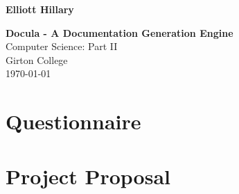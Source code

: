 \documentclass[twoside,12pt,notitlepage]{Classes/CUEDthesisPSnPDF}
\begin{document}
\pagestyle{empty}

\hfill{\LARGE \bf Elliott Hillary}

\vspace*{60mm}
\begin{center}
\Huge
{\bf Docula - A Documentation Generation Engine} \\
\vspace*{5mm}
Computer Science: Part II\\
\vspace*{5mm}
Girton College \\
\vspace*{5mm}
\today  %
\end{center}

\setcounter{secnumdepth}{3}
\setcounter{tocdepth}{3}

\frontmatter %
\cleardoublepage

\cleardoublepage


\tableofcontents

\mainmatter %
\pagestyle{fancy}






\printbibliography

\begin{appendices}

\chapter{Questionnaire}

\chapter{Project Proposal}

\end{appendices}
\end{document}
